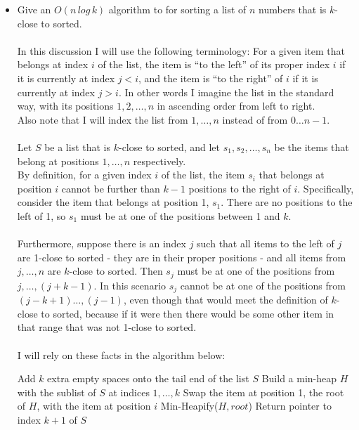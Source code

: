 \documentclass[11pt]{article}
\begin{document}
\begin{itemize}
\newpage

\item{
Give an $O(n\,log\,k)$ algorithm to for sorting a list of $n$ numbers that is $k$-close to sorted.
\\
\\
In this discussion I will use the following terminology: For a given item that belongs at index $i$ of the list, the item is ``to the left'' of its proper index $i$ if it is currently at index $j < i$, and the item is ``to the right'' of $i$ if it is currently at index $j > i$. In other words I imagine the list in the standard way, with its positions ${1,2,\dots,n}$ in ascending order from left to right. \\
Also note that I will index the list from $1,\dots, n$ instead of from $0\dots n-1$.
\\
\\
Let $S$ be a list that is $k$-close to sorted, and let $s_1,s_2,\dots, s_n$ be the items that belong at positions $1,\dots, n$ respectively. \\
By definition, for a given index $i$ of the list, the item $s_i$ that belongs at position $i$ cannot be further than $k-1$ positions to the right of $i$. Specifically, consider the item that belongs at position 1, $s_1$.  There are no positions to the left of 1, so $s_1$ must be at one of the positions between 1 and $k$.
\\
\\
Furthermore, suppose there is an index $j$ such that all items to the left of $j$ are 1-close to sorted - they are in their proper positions - and all items from $j,\dots,n$ are $k$-close to sorted. Then $s_j$ must be at one of the positions from $j,\dots,(j+k-1)$. In this scenario $s_j$ cannot be at one of the positions from $(j-k+1)\dots, (j-1)$, even though that would meet the definition of $k$-close to sorted, because if it were then there would be some other item in that range that was not 1-close to sorted.
\\
\\
I will rely on these facts in the algorithm below: 
\\
\begin{algorithmic}
\STATE Add $k$ extra empty spaces onto the tail end of the list $S$ 
\STATE Build a min-heap $H$ with the sublist of $S$ at indices $1,\dots,k$
	\STATE Swap the item at position 1, the root of $H$, with the item at position $i$
	\STATE Min-Heapify($H,root$)
\ENDFOR
\STATE Return pointer to index $k+1$ of $S$ 
\end{algorithmic}

}
\end{itemize}
\end{document}
